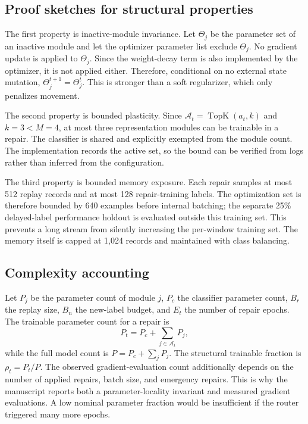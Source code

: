 \subsection{Proof sketches for structural properties}
The first property is inactive-module invariance. Let $\Theta_j$ be the parameter set of an inactive module and let the optimizer parameter list exclude $\Theta_j$. No gradient update is applied to $\Theta_j$. Since the weight-decay term is also implemented by the optimizer, it is not applied either. Therefore, conditional on no external state mutation, $\Theta_j^{t+1}=\Theta_j^t$. This is stronger than a soft regularizer, which only penalizes movement.

The second property is bounded plasticity. Since $\mathcal A_t=\operatorname{TopK}(a_t,k)$ and $k=3<M=4$, at most three representation modules can be trainable in a repair. The classifier is shared and explicitly exempted from the module count. The implementation records the active set, so the bound can be verified from logs rather than inferred from the configuration.

The third property is bounded memory exposure. Each repair samples at most 512 replay records and at most 128 repair-training labels. The optimization set is therefore bounded by 640 examples before internal batching; the separate 25\% delayed-label performance holdout is evaluated outside this training set. This prevents a long stream from silently increasing the per-window training set. The memory itself is capped at 1,024 records and maintained with class balancing.

\subsection{Complexity accounting}
Let $P_j$ be the parameter count of module $j$, $P_c$ the classifier parameter count, $B_r$ the replay size, $B_n$ the new-label budget, and $E_t$ the number of repair epochs. The trainable parameter count for a repair is
\begin{equation}
 P_t=P_c+\sum_{j\in\mathcal A_t}P_j,
\end{equation}
while the full model count is $P=P_c+\sum_jP_j$. The structural trainable fraction is $\rho_t=P_t/P$. The observed gradient-evaluation count additionally depends on the number of applied repairs, batch size, and emergency repairs. This is why the manuscript reports both a parameter-locality invariant and measured gradient evaluations. A low nominal parameter fraction would be insufficient if the router triggered many more epochs.

